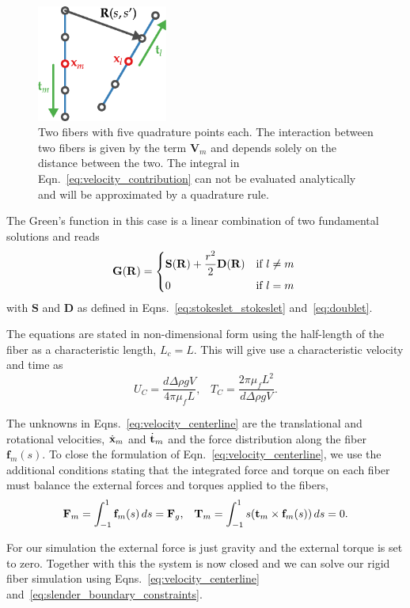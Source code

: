 \begin{figure}[!htbp]
  \centering
  \includegraphics[width=0.3819660112501450000000\textwidth]{img/fiber_contribution.pdf}
  \caption[Two interacting fibers with five quadrature points.]{Two fibers with five quadrature points each. The interaction between two fibers is given by the term $\mathbf{V}_m$ and depends solely on the distance between the two. The integral in Eqn.~\eqref{eq:velocity_contribution} can not be evaluated analytically and will be approximated by a quadrature rule.}
  \label{fig:fiber_contribution}
\end{figure}

The Green's function in this case is a linear combination of two fundamental solutions and reads
\begin{equation}
  \label{eq:green_function}
  \mathbf{G}(\mathbf{R}) = \begin{dcases*}
  \mathbf{S}(\mathbf{R}) + \frac{r^2}{2}\mathbf{D}(\mathbf{R}) & if $l \neq m$\\
  0 & if $l = m$
  \end{dcases*}
\end{equation}
with $\mathbf{S}$ and $\mathbf{D}$ as defined in Eqns.~\eqref{eq:stokeslet_stokeslet} and~\eqref{eq:doublet}.

The equations are stated in non-dimensional form using the half-length of the fiber as a characteristic length, $L_c = L$. This will give use a characteristic velocity and time as
\begin{equation}
  U_C = \frac{d \Delta \rho g V}{4\pi\mu_fL} \text{,} \quad T_C = \frac{2\pi\mu_fL^2}{d \Delta \rho g V} \text{.}
\end{equation}

The unknowns in Eqns.~\eqref{eq:velocity_centerline} are the translational and rotational velocities, $\dot{\mathbf{x}}_m$ and $\dot{\mathbf{t}}_m$ and the force distribution along the fiber $\mathbf{f}_m(s)$. To close the formulation of Eqn.~\eqref{eq:velocity_centerline}, we use the additional conditions stating that the integrated force and torque on each fiber must balance the external forces and torques applied to the fibers,
\begin{equation}
	\label{eq:slender_boundary_constraints}
  \mathbf{F}_m = \int_{-1}^{1} \mathbf{f}_m(s) \, ds = \mathbf{F}_g \text{,} \quad \mathbf{T}_m = \int_{-1}^{1} s(\mathbf{t}_m \times \mathbf{f}_m(s)) \, ds = 0 \text{.}
\end{equation}

For our simulation the external force is just gravity and the external torque is set to zero. Together with this the system is now closed and we can solve our rigid fiber simulation using Eqns.~\eqref{eq:velocity_centerline} and~\eqref{eq:slender_boundary_constraints}.